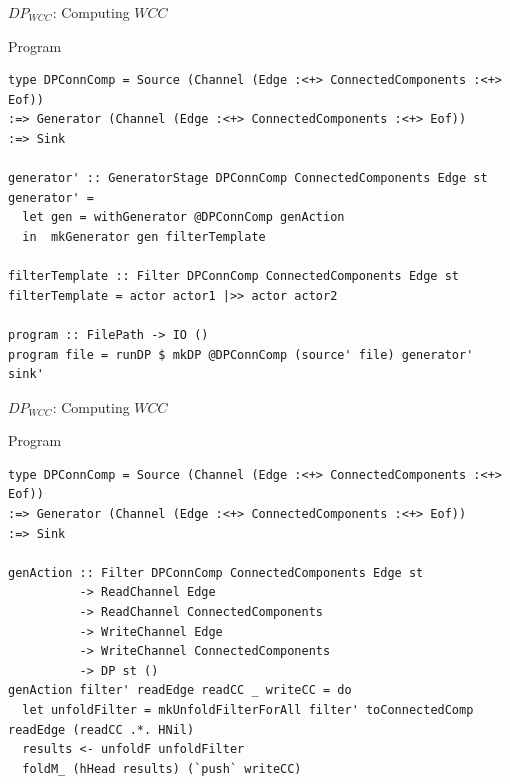 \documentclass{beamer}
\begin{document}
  \begin{frame}[fragile]{$DP_{WCC}$: Computing $WCC$}
    \begin{block}{Program}
      \begin{verbatim}      
type DPConnComp = Source (Channel (Edge :<+> ConnectedComponents :<+> Eof))
:=> Generator (Channel (Edge :<+> ConnectedComponents :<+> Eof))
:=> Sink

generator' :: GeneratorStage DPConnComp ConnectedComponents Edge st
generator' =
  let gen = withGenerator @DPConnComp genAction
  in  mkGenerator gen filterTemplate

filterTemplate :: Filter DPConnComp ConnectedComponents Edge st
filterTemplate = actor actor1 |>> actor actor2

program :: FilePath -> IO ()
program file = runDP $ mkDP @DPConnComp (source' file) generator' sink'
      \end{verbatim}
    \end{block}
  \end{frame}

  \begin{frame}[fragile]{$DP_{WCC}$: Computing $WCC$}
    \begin{block}{Program}
      \begin{verbatim}      
type DPConnComp = Source (Channel (Edge :<+> ConnectedComponents :<+> Eof))
:=> Generator (Channel (Edge :<+> ConnectedComponents :<+> Eof))
:=> Sink

genAction :: Filter DPConnComp ConnectedComponents Edge st
          -> ReadChannel Edge
          -> ReadChannel ConnectedComponents
          -> WriteChannel Edge
          -> WriteChannel ConnectedComponents
          -> DP st ()
genAction filter' readEdge readCC _ writeCC = do
  let unfoldFilter = mkUnfoldFilterForAll filter' toConnectedComp readEdge (readCC .*. HNil) 
  results <- unfoldF unfoldFilter
  foldM_ (hHead results) (`push` writeCC)
      \end{verbatim}
    \end{block}
  \end{frame}
\end{document}
